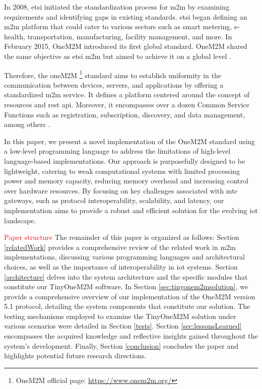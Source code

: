 \documentclass[a4paper,fleqn]{cas-dc}
\begin{document}
In 2008, \gls{etsi} initiated the standardization process for \gls{m2m} by examining requirements and identifying gaps in existing standards. \gls{etsi} began defining an \gls{m2m} platform that could cater to various sectors such as smart metering, e-health, transportation, manufacturing, facility management, and more. In February 2015, OneM2M introduced its first global standard. OneM2M shared the same objective as \gls{etsi} \gls{m2m} but aimed to achieve it on a global level \cite{pticek_architecture_2015}. 

Therefore, the oneM2M \footnote{OneM2M official page: \url{https://www.onem2m.org/}} standard aims to establish uniformity in the communication between devices, servers, and applications by offering a standardized \gls{m2m} service. It defines a platform centered around the concept of resources and \gls{rest} \gls{api}. Moreover, it encompasses over a dozen Common Service Functions such as registration, subscription, discovery, and data management, among others \cite{onem2m_standard}.

In this paper, we present a novel implementation of the OneM2M standard using a low-level programming language to address the limitations of high-level language-based implementations. Our approach is purposefully designed to be lightweight, catering to weak computational systems with limited processing power and memory capacity, reducing memory overhead and increasing control over hardware resources. By focusing on key challenges associated with \gls{mtc} gateways, such as protocol interoperability, scalability, and latency, our implementation aims to provide a robust and efficient solution for the evolving \gls{iot} landscape.

\textcolor{red}{Paper structure} The remainder of this paper is organized as follows: Section \ref{relatedWork} provides a comprehensive review of the related work in \gls{m2m} implementations, discussing various programming languages and architectural choices, as well as the importance of interoperability in \gls{iot} systems. Section \ref{architecture} delves into the system architecture and the specific modules that constitute our TinyOneM2M software. In Section \ref{sec:tinyonem2msolution}, we provide a comprehensive overview of our implementation of the OneM2M version 5.1 protocol, detailing the system components that constitute our solution. The testing mechanisms employed to examine the TinyOneM2M solution under various scenarios were detailed in Section \ref{tests}. Section \ref{sec:lessonsLearned} encompasses the acquired knowledge and reflective insights gained throughout the system's development. Finally, Section \ref{conclusion} concludes the paper and highlights potential future research directions.
\end{document}
